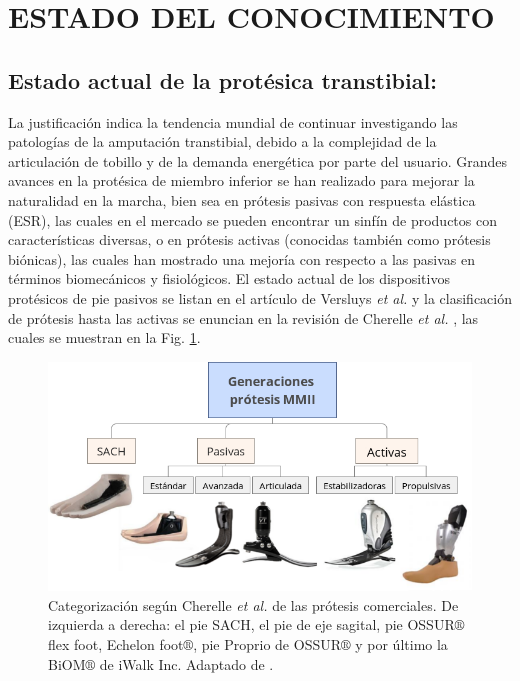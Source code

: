 \documentclass[12pt,english]{article}
\begin{document}
\section*{\label{sub:Estado-del-conocimiento:}ESTADO DEL CONOCIMIENTO}


\subsection*{Estado actual de la protésica transtibial:}

La justificación indica la tendencia mundial de continuar investigando
las patologías de la amputación transtibial, debido a la complejidad
de la articulación de tobillo y de la demanda energética por parte
del usuario. Grandes avances en la protésica de miembro inferior se
han realizado para mejorar la naturalidad en la marcha, bien sea en
prótesis pasivas con respuesta elástica (ESR), las cuales
en el mercado se pueden encontrar un sinfín de productos con características
diversas, o en prótesis activas (conocidas también como prótesis
biónicas), las cuales han mostrado una mejoría con respecto a las
pasivas en términos biomecánicos y fisiológicos. El estado actual
de los dispositivos protésicos de pie pasivos se listan en el artículo
de Versluys \emph{et al.} \cite{Versluys2009} y la clasificación
de prótesis hasta las activas se enuncian en la revisión de Cherelle
\emph{et al.} \cite{Cherelle2014a}, las cuales se muestran en la
Fig. \ref{fig:Categorizaci=0000F3n-seg=0000FAn-Cherelle}.

\begin{figure}[H]
\begin{centering}
\includegraphics[scale=0.68]{Generacionesprotesis}
\par\end{centering}

\caption{\label{fig:Categorizaci=0000F3n-seg=0000FAn-Cherelle}Categorización
según Cherelle \emph{et al.}\cite{Cherelle2014a} de las prótesis
comerciales. De izquierda a derecha: el pie SACH, el pie de eje sagital,
pie OSSUR$\circledR$ flex foot, Echelon foot$\circledR$, pie Proprio
de OSSUR$\circledR$ y por último la BiOM$\circledR$ de iWalk Inc.
Adaptado de \cite{Cherelle2014a}.}
\end{figure}
\end{document}
